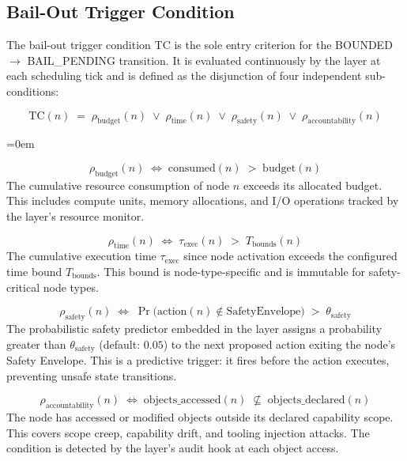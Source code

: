 
\subsection{Bail-Out Trigger Condition}\label{sec:bailout-trigger}

The bail-out trigger condition TC is the sole entry criterion for the
BOUNDED $\rightarrow$ BAIL\_PENDING transition. It is evaluated continuously
by the \bounds{} layer at each scheduling tick and is defined as the disjunction
of four independent sub-conditions:

\begin{equation}
\text{TC}(n) \;=\; \rho_{\text{budget}}(n) \;\lor\; \rho_{\text{time}}(n)
\;\lor\; \rho_{\text{safety}}(n) \;\lor\; \rho_{\text{accountability}}(n)
\tag{eq:trigger-condition}
\end{equation}

\begin{trivlist}\itemindent=0em
\item[\textbf{Resource budget exhaustion $\rho_{\text{budget}}$:}]
\[
\rho_{\text{budget}}(n) \;\iff\; \text{consumed}(n) \;>\; \text{budget}(n)
\]
The cumulative resource consumption of node $n$ exceeds its allocated budget.
This includes compute units, memory allocations, and I/O operations tracked by
the \fact{} layer's resource monitor.

\item[\textbf{Execution time limit $\rho_{\text{time}}$:}]
\[
\rho_{\text{time}}(n) \;\iff\; \tau_{\text{exec}}(n) \;>\; T_{\text{bounds}}(n)
\]
The cumulative execution time $\tau_{\text{exec}}$ since node activation exceeds
the configured time bound $T_{\text{bounds}}$. This bound is node-type-specific
and is immutable for safety-critical node types.

\item[\textbf{Safety envelope prediction $\rho_{\text{safety}}$:}]
\[
\rho_{\text{safety}}(n) \;\iff\; \Pr\!\bigl(\text{action}(n) \notin \text{SafetyEnvelope}\bigr) \;>\; \theta_{\text{safety}}
\]
The probabilistic safety predictor embedded in the \bounds{} layer assigns a
probability greater than $\theta_{\text{safety}}$ (default: $0.05$) to the next
proposed action exiting the node's Safety Envelope. This is a predictive trigger:
it fires before the action executes, preventing unsafe state transitions.

\item[\textbf{Accountability boundary violation $\rho_{\text{accountability}}$:}]
\[
\rho_{\text{accountability}}(n) \;\iff\; \text{objects\_accessed}(n) \;\not\subseteq\; \text{objects\_declared}(n)
\]
The node has accessed or modified objects outside its declared capability scope.
This covers scope creep, capability drift, and tooling injection attacks. The
condition is detected by the \fact{} layer's audit hook at each object access.
\end{trivlist}

